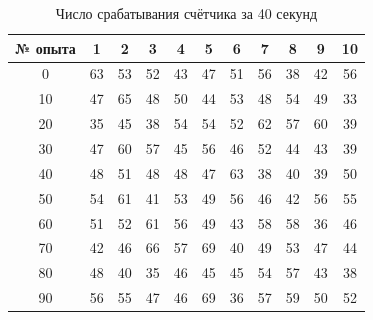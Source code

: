 \begin{table}
    \centering
    \caption{Число срабатывания счётчика за 40 секунд}
    \begin{tabular}{|c|c|c|c|c|c|c|c|c|c|c|}
    \hline
        № опыта & 1 & 2 & 3 & 4 & 5 & 6 & 7 & 8 & 9 & 10 \\ \hline
        0 & 63 & 53 & 52 & 43 & 47 & 51 & 56 & 38 & 42 & 56 \\ \hline
        10 & 47 & 65 & 48 & 50 & 44 & 53 & 48 & 54 & 49 & 33 \\ \hline
        20 & 35 & 45 & 38 & 54 & 54 & 52 & 62 & 57 & 60 & 39 \\ \hline
        30 & 47 & 60 & 57 & 45 & 56 & 46 & 52 & 44 & 43 & 39 \\ \hline
        40 & 48 & 51 & 48 & 48 & 47 & 63 & 38 & 40 & 39 & 50 \\ \hline
        50 & 54 & 61 & 41 & 53 & 49 & 56 & 46 & 42 & 56 & 55 \\ \hline
        60 & 51 & 52 & 61 & 56 & 49 & 43 & 58 & 58 & 36 & 46 \\ \hline
        70 & 42 & 46 & 66 & 57 & 69 & 40 & 49 & 53 & 47 & 44 \\ \hline
        80 & 48 & 40 & 35 & 46 & 45 & 45 & 54 & 57 & 43 & 38 \\ \hline
        90 & 56 & 55 & 47 & 46 & 69 & 36 & 57 & 59 & 50 & 52 \\ \hline
    \end{tabular}
    \label{table:2}
\end{table}


